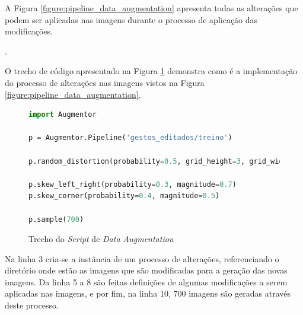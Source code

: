 
\par A Figura \ref{figure:pipeline_data_augmentation} apresenta todas as alterações que podem ser aplicadas nas imagens durante o processo de aplicação das modificações.

.

\par O trecho de código apresentado na Figura \ref{figure:dataaugmentation} demonstra como é a implementação do processo de alterações nas imagens vistos na Figura \ref{figure:pipeline_data_augmentation}.

\begin{figure}[H]
    \centering
    \begin{lstlisting}[language=Python]
import Augmentor

p = Augmentor.Pipeline('gestos_editados/treino')

p.random_distortion(probability=0.5, grid_height=3, grid_width=3, magnitude=2)

p.skew_left_right(probability=0.3, magnitude=0.7)
p.skew_corner(probability=0.4, magnitude=0.5)

p.sample(700)
    \end{lstlisting}
    \caption{Trecho do \textit{Script} de \textit{Data Augmentation}}
    \label{figure:dataaugmentation}
\end{figure}

\par Na linha 3 cria-se a instância de um processo de alterações, referenciando o diretório onde estão as imagens que são modificadas para a geração das novas imagens. Da linha 5 a 8 são feitas definições de algumas modificações a serem aplicadas nas imagens, e por fim, na linha 10, 700 imagens são geradas através deste processo.



